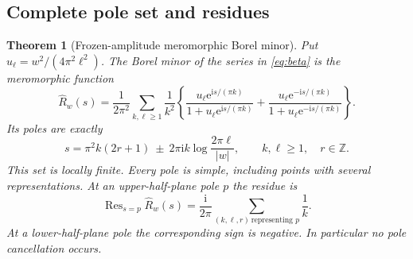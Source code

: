\documentclass[11pt,a4paper]{article}
\numberwithin{equation}{section}
\newtheorem{theorem}{Theorem}[section]
\theoremstyle{definition}
\theoremstyle{remark}
\newcommand{\ii}{\mathrm i}
\newcommand{\e}{\mathrm e}
\DeclareMathOperator{\Res}{Res}
\begin{document}
\subsection{Complete pole set and residues}
\begin{theorem}[Frozen-amplitude meromorphic Borel minor]
\label{thm:frozen}
Put $u_\ell=w^2/(4\pi^2\ell^2)$. The Borel minor of the series in \eqref{eq:beta} is the meromorphic function
\begin{equation}
 \widehat R_w(s)=\frac1{2\pi^2}\sum_{k,\ell\ge1}\frac1{k^2}
 \left\{
 \frac{u_\ell\e^{\ii s/(\pi k)}}{1+u_\ell\e^{\ii s/(\pi k)}}
 +\frac{u_\ell\e^{-\ii s/(\pi k)}}{1+u_\ell\e^{-\ii s/(\pi k)}}
 \right\}.
 \label{eq:frozenB}
\end{equation}
Its poles are exactly
\begin{equation}
 s=\pi^2k(2r+1)\ \pm\ 2\pi\ii k\log\frac{2\pi\ell}{|w|},
 \qquad k,\ell\ge1,\quad r\in\mathbb Z.
 \label{eq:poles}
\end{equation}
This set is locally finite. Every pole is simple, including points with several representations. At an upper-half-plane pole $p$ the residue is
\begin{equation}
 \Res_{s=p}\widehat R_w(s)=\frac{\ii}{2\pi}
       \sum_{(k,\ell,r)\,\text{representing }p}\frac1k.
 \label{eq:resupper}
\end{equation}
At a lower-half-plane pole the corresponding sign is negative. In particular no pole cancellation occurs.
\end{theorem}
\end{document}
